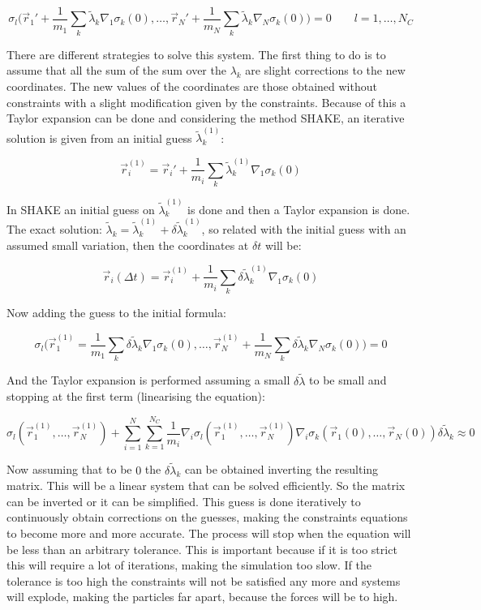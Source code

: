 		$$\sigma_l\biggl(\vec{r}_1' + \frac{1}{m_1}\sum\limits_k\tilde{\lambda}_k\nabla_1\sigma_k(0), \dots, \vec{r}_N' + \frac{1}{m_N}\sum\limits_k\tilde{\lambda}_k\nabla_N\sigma_k(0)\biggr) = 0\qquad l = 1, \dots, N_C$$

		There are different strategies to solve this system.
		The first thing to do is to assume that all the sum of the sum over the $\lambda_k$ are slight corrections to the new coordinates.
		The new values of the coordinates are those obtained without constraints with a slight modification given by the constraints.
		Because of this a Taylor expansion can be done and considering the method SHAKE, an iterative solution is given from an initial guess $\tilde{\lambda}_k^{(1)}$:

		$$\vec{r}_i^{(1)} = \vec{r}_i' + \frac{1}{m_i}\sum\limits_k\tilde{\lambda}_k^{(1)}\nabla_1\sigma_k(0)$$

		In SHAKE an initial guess on $\tilde{\lambda}_k^{(1)}$ is done and then a Taylor expansion is done.
		The exact solution: $\tilde{\lambda}_k = \tilde{\lambda}_k^{(1)} + \delta\tilde{\lambda}_k^{(1)}$, so related with the initial guess with an assumed small variation, then the coordinates at $\delta t$ will be:

		$$\vec{r}_i(\Delta t) = \vec{r}_i^{(1)} + \frac{1}{m_i}\sum\limits_k\delta\tilde{\lambda}_k^{(1)}\nabla_1\sigma_k(0)$$

		Now adding the guess to the initial formula:

		$$\sigma_l\biggl(\vec{r}_1^{(1)} = \frac{1}{m_1}\sum\limits_k\delta\tilde{\lambda}_k\nabla_1\sigma_k(0), \dots, \vec{r}_N^{(1)} + \frac{1}{m_N}\sum\limits_{k}\delta\tilde{\lambda}_k\nabla_N\sigma_k(0)\biggr) = 0$$

		And the Taylor expansion is performed assuming a small $\delta\tilde{\lambda}$ to be small and stopping at the first term (linearising the equation):

		$$\sigma_l(\vec{r}_1^{(1)}, \dots, \vec{r}_N^{(1)}) + \sum\limits_{i=1}^N\sum\limits_{k=1}^{N_C}\frac{1}{m_i}\nabla_i\sigma_l(\vec{r}_1^{(1)}, \dots, \vec{r}_N^{(1)})\nabla_i\sigma_k(\vec{r}_1(0), \dots, \vec{r}_N(0))\delta\tilde{\lambda}_k\approx 0$$

		Now assuming that to be $0$ the $\delta\tilde{\lambda}_k$ can be obtained inverting the resulting matrix.
		This will be a linear system that can be solved efficiently.
		So the matrix can be inverted or it can be simplified.
		This guess is done iteratively to continuously obtain corrections on the guesses, making the constraints equations to become more and more accurate.
		The process will stop when the equation will be less than an arbitrary tolerance.
		This is important because if it is too strict this will require a lot of iterations, making the simulation too slow.
		If the tolerance is too high the constraints will not be satisfied any more and systems will explode, making the particles far apart, because the forces will be to high.

